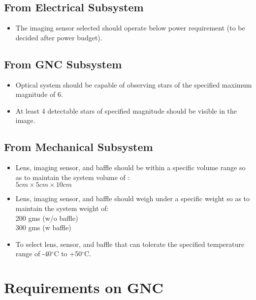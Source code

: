 \documentclass[../../main.tex]{subfiles}
\begin{document}
\subsection{From Electrical Subsystem}
\begin{itemize}
    \item The imaging sensor selected should operate below power requirement (to be decided after power budget).
    
\end{itemize}
\subsection{From GNC Subsystem}
\begin{itemize}
    \item Optical system should be capable of observing stars of the specified maximum magnitude of 6.
    \item At least 4 detectable stars of specified magnitude should be visible in the image.
\end{itemize}

\subsection{From Mechanical Subsystem}
\begin{itemize}
    \item Lens, imaging sensor, and baffle should be within a specific volume range so as to maintain the system volume of : \\$5cm\times5cm\times10cm$ %
    \item Lens, imaging sensor, and baffle should weigh under a specific weight so as to maintain the system weight of:\\200 gms (w/o baffle)\\300 gms (w baffle)
    \item To select lens, sensor, and baffle that can tolerate the specified temperature range of -40$^\circ$C to +50$^\circ$C. 
\end{itemize}


\newpage
\section{Requirements on GNC}
\end{document}
